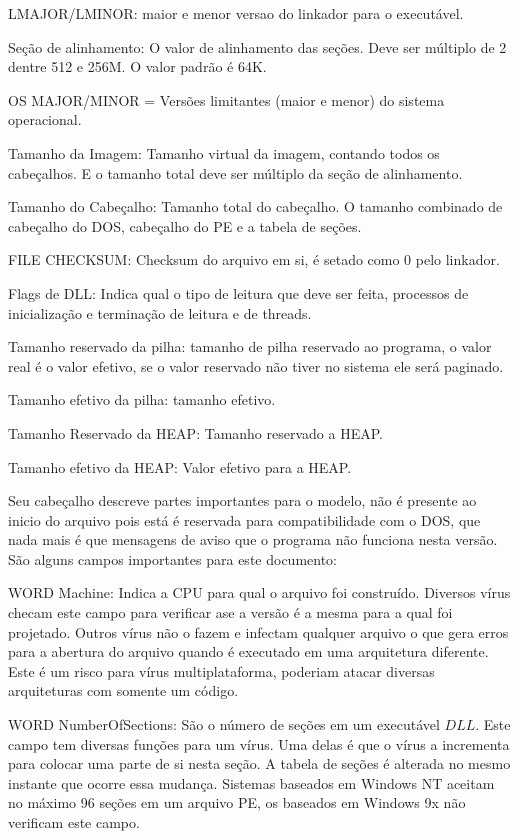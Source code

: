 LMAJOR/LMINOR: maior e menor versao do linkador para o executável.


Seção de alinhamento: O valor de alinhamento das seções. Deve ser
múltiplo de 2 dentre 512 e 256M. O valor padrão é 64K.


OS MAJOR/MINOR = Versões limitantes (maior e menor) do sistema operacional.


Tamanho da Imagem: Tamanho virtual da imagem, contando todos os cabeçalhos.
E o tamanho total deve ser múltiplo da seção de alinhamento.


Tamanho do Cabeçalho: Tamanho total do cabeçalho. O tamanho combinado
de cabeçalho do DOS, cabeçalho do PE e a tabela de seções.


FILE CHECKSUM: Checksum do arquivo em si, é setado como 0 pelo linkador.


Flags de DLL: Indica qual o tipo de leitura que deve ser feita, processos
de inicialização e terminação de leitura e de threads.


Tamanho reservado da pilha: tamanho de pilha reservado ao programa,
o valor real é o valor efetivo, se o valor reservado não tiver no
sistema ele será paginado.


Tamanho efetivo da pilha: tamanho efetivo.


Tamanho Reservado da HEAP: Tamanho reservado a HEAP.


Tamanho efetivo da HEAP: Valor efetivo para a HEAP.


	Seu cabeçalho descreve partes importantes para o modelo, não é presente ao inicio do arquivo pois está 
 é reservada para compatibilidade com o DOS, que nada mais é que mensagens de aviso que o programa
 não funciona nesta versão.
 São alguns campos importantes para este documento:
 
  
 WORD Machine: Indica a CPU para qual o arquivo foi construído. Diversos vírus checam este
 campo para verificar ase a versão é a mesma para a qual foi projetado. Outros vírus não o fazem
  e infectam qualquer arquivo o que gera erros para a abertura do arquivo quando é executado em
  uma arquitetura diferente. Este é um risco para vírus multiplataforma, poderiam atacar
  diversas arquiteturas com somente um código.

WORD NumberOfSections: São o número de seções em um executável \(DLL\). Este campo tem 
 diversas funções para um vírus. Uma delas é que o vírus a incrementa para colocar uma 
 parte de si nesta seção. A tabela de seções é alterada no mesmo instante que ocorre essa
 mudança. Sistemas baseados em Windows NT aceitam no máximo 96 seções em um arquivo PE, 
 os baseados em Windows 9x não verificam este campo.

